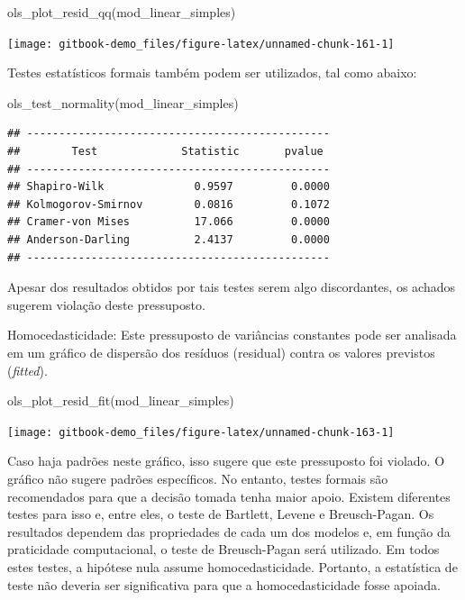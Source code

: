 \documentclass[
]{book}
\newenvironment{Shaded}{\begin{snugshade}}{\end{snugshade}}
\newcommand{\FunctionTok}[1]{\textcolor[rgb]{0.00,0.00,0.00}{#1}}
\newcommand{\NormalTok}[1]{#1}
\begin{document}
\begin{Shaded}
\begin{Highlighting}[]
\FunctionTok{ols\_plot\_resid\_qq}\NormalTok{(mod\_linear\_simples)}
\end{Highlighting}
\end{Shaded}

\begin{center}\texttt{[image: gitbook-demo\_files/figure-latex/unnamed-chunk-161-1]} \end{center}

Testes estatísticos formais também podem ser utilizados, tal como abaixo:

\begin{Shaded}
\begin{Highlighting}[]
\FunctionTok{ols\_test\_normality}\NormalTok{(mod\_linear\_simples)}
\end{Highlighting}
\end{Shaded}

\begin{verbatim}
## -----------------------------------------------
##        Test             Statistic       pvalue  
## -----------------------------------------------
## Shapiro-Wilk              0.9597         0.0000 
## Kolmogorov-Smirnov        0.0816         0.1072 
## Cramer-von Mises          17.066         0.0000 
## Anderson-Darling          2.4137         0.0000 
## -----------------------------------------------
\end{verbatim}

Apesar dos resultados obtidos por tais testes serem algo discordantes, os achados sugerem violação deste pressuposto.

Homocedasticidade: Este pressuposto de variâncias constantes pode ser analisada em um gráfico de dispersão dos resíduos (residual) contra os valores previstos (\emph{fitted}).

\begin{Shaded}
\begin{Highlighting}[]
\FunctionTok{ols\_plot\_resid\_fit}\NormalTok{(mod\_linear\_simples)}
\end{Highlighting}
\end{Shaded}

\begin{center}\texttt{[image: gitbook-demo\_files/figure-latex/unnamed-chunk-163-1]} \end{center}

Caso haja padrões neste gráfico, isso sugere que este pressuposto foi violado. O gráfico não sugere padrões específicos. No entanto, testes formais são recomendados para que a decisão tomada tenha maior apoio. Existem diferentes testes para isso e, entre eles, o teste de Bartlett, Levene e Breusch-Pagan. Os resultados dependem das propriedades de cada um dos modelos e, em função da praticidade computacional, o teste de Breusch-Pagan será utilizado. Em todos estes testes, a hipótese nula assume homocedasticidade. Portanto, a estatística de teste não deveria ser significativa para que a homocedasticidade fosse apoiada.
\end{document}
